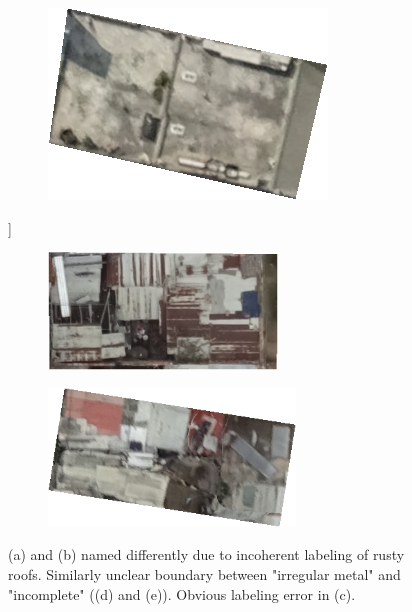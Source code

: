 \documentclass[11pt]{article}
\begin{document}
\begin{figure}
\begin{subfigure}[c]{0.31\textwidth}
		\end{subfigure}
		\begin{subfigure}[c]{0.31\textwidth}
			\centering
			\includegraphics[width=.9\textwidth]{figures/wrong_labels/hm_should_be_conc.png}
		\end{subfigure}
		\vspace{.3cm}]
		\begin{subfigure}[c]{0.4\textwidth}
			\centering
			\includegraphics[width=0.67\textwidth]{figures/wrong_labels/irr_holes.png}
		\end{subfigure}
		\begin{subfigure}[c]{0.4\textwidth}
			\centering		
			\includegraphics[width=0.72\textwidth]{figures/wrong_labels/inc_holes.png}
		\end{subfigure}
		\caption{(a) and (b) named differently due to incoherent labeling of rusty roofs. Similarly unclear boundary between "irregular metal" and "incomplete" ((d) and (e)). Obvious labeling error in (c).}
		\label{fig:ambiguities}
	\end{figure}
\end{document}
